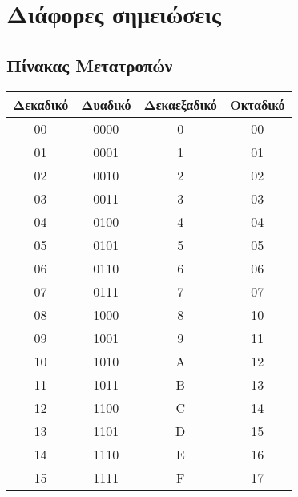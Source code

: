 \section{Διάφορες σημειώσεις}

\subsection{Πίνακας Μετατροπών}

\begin{center}
	\begin{tabular}{|c|c|c|c|}
	\hline
	Δεκαδικό & Δυαδικό & Δεκαεξαδικό & Οκταδικό \\
	\hline
	00 & 0000 & 0& 00 \\
	\hline
	01 & 0001 & 1& 01\\
	\hline
	02 & 0010 & 2& 02\\
	\hline
	03 & 0011 & 3& 03\\
	\hline
	04& 0100 & 4& 04\\
	\hline
	05& 0101 & 5& 05\\
	\hline
	06& 0110 & 6& 06\\
	\hline
	07& 0111 & 7& 07\\
	\hline
	08& 1000 & 8& 10\\
	\hline
	09& 1001 & 9& 11\\
	\hline
	10& 1010 & A& 12\\
	\hline
	11& 1011 & B& 13\\
	\hline
	12& 1100 & C& 14\\
	\hline
	13& 1101 & D& 15\\
	\hline
	14& 1110 & E& 16\\
	\hline
	15& 1111 & F& 17\\
	\hline
	\end{tabular}
\end{center}
